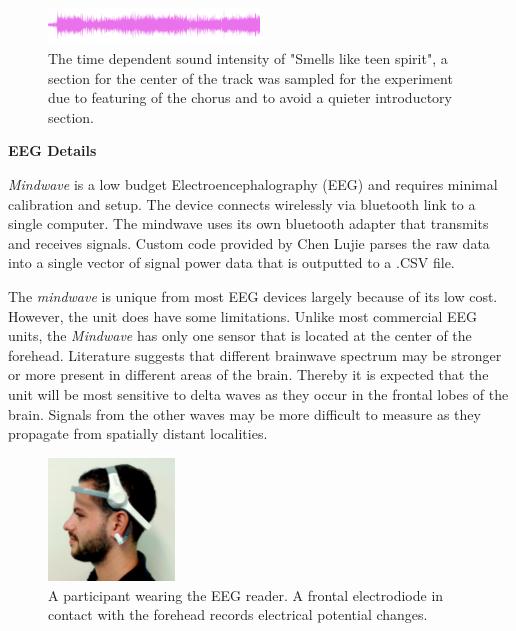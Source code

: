 \documentclass[twocolumn,superscriptaddress]{revtex4-1}
\theoremstyle{definition}
\theoremstyle{remark}
\begin{document}
\begin{figure}[h!]
  \centering
      \includegraphics[width=0.5\textwidth]{nirvana}
  \caption{The time dependent sound intensity of "Smells like teen spirit",  a section for the center of the track was sampled for the experiment due to featuring of the chorus and to avoid a quieter introductory section.}
\end{figure}


\begin{center}
\textbf{EEG Details}
\end{center} 

\emph{Mindwave} is a low budget Electroencephalography (EEG) and requires minimal calibration and setup. The device connects wirelessly via bluetooth link to a single computer. The mindwave uses its own bluetooth adapter that transmits and receives signals. Custom code provided by Chen Lujie parses the raw data into a single vector of signal power data that is outputted to a .CSV file.

The \emph{mindwave} is unique from most EEG devices largely because of its low cost. However, the unit does have some limitations. Unlike most commercial EEG units, the \emph{Mindwave} has only one sensor that is located at the center of the forehead. Literature suggests that different brainwave spectrum may be stronger or more present in different areas of the brain. Thereby it is expected that the unit will be most sensitive to delta waves as they occur in the frontal lobes of the brain. Signals from the other waves may be more difficult to measure as they propagate from spatially distant localities. 

\begin{figure}[h!]
  \centering
      \includegraphics[width=0.3\textwidth]{figures/zakside1}
  \caption{A participant wearing the EEG reader. A frontal electrodiode in contact with the forehead records electrical potential changes.}
\end{figure}
\end{document}
